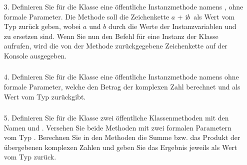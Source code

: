 \begin{frame}%
  \frametitle{\stitle}%
\begin{enumerate}
\item[3.]
  Definieren Sie f\"ur die Klasse  eine \"offentliche Instanzmethode namens , ohne formale Parameter.
  Die Methode soll die Zeichenkette \glqq $a$ + i$b$\grqq\ als Wert vom Typ  zur\"uck geben, wobei $a$ und $b$ durch die Werte der Instanzvariablen  und  zu ersetzen sind.
  Wenn Sie nun den Befehl  f\"ur eine Instanz  der Klasse  aufrufen, wird die von der Methode  zur\"uckgegebene Zeichenkette auf der Konsole ausgegeben.
\end{enumerate}
\pause

\end{frame}


\begin{frame}%
  \frametitle{\stitle}%
\begin{enumerate}
\item[4.]
  Definieren Sie f\"ur die Klasse  eine \"offentliche Instanzmethode namens  ohne formale Parameter, welche den Betrag der komplexen Zahl berechnet und als Wert vom Typ  zur\"uckgibt.
\end{enumerate}
\pause

\end{frame}


\begin{frame}%
  \frametitle{\stitle}%
\begin{enumerate}
\item[5.]
  Definieren Sie f\"ur die Klasse  zwei \"offentliche Klassenmethoden mit den Namen  und .
  Versehen Sie beide Methoden mit zwei formalen Parametern vom Typ .
  Berechnen Sie in den Methoden die Summe bzw{.} das Produkt der \"ubergebenen komplexen Zahlen und geben Sie das Ergebnis jeweils als Wert vom Typ  zur\"uck.
\end{enumerate}
\pause

\end{frame}


